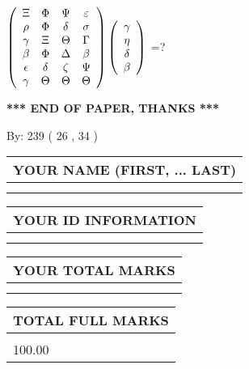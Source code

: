 \documentclass[12pt]{article}
\begin{document}
 
$  %
 \left( \begin{array}
 {
 c
 c
 c
 c
 }
                    \Xi & 
 \Phi & 
 \Psi & 
 \varepsilon \\ 
 \rho & 
 \Phi & 
 \delta & 
 \sigma \\ 
 \gamma & 
                    \Xi & 
 \Theta & 
 \Gamma \\ 
 \beta & 
 \Phi & 
 \Delta & 
 \beta \\ 
 \epsilon & 
 \delta & 
                    \zeta & 
 \Psi \\ 
 \gamma & 
 \Theta & 
 \Theta & 
 \Theta
 \end{array} \right)
 \left( \begin{array}
 {
 c
 }
 \gamma \\ 
 \eta \\ 
 \delta \\ 
 \beta
 \end{array} \right)
$ =?
 

 

 
\vspace{0.3in}
   
   
 \vspace{0.2in}
 
   
   
   
   
\vspace{1.0in} 
{\textbf{\large{ *** END OF PAPER, THANKS *** }}} 
   
   
\hspace{1.0in} By: 
 239 ( 26 ,  34 )
   
   
   
   
\newpage 
\setcounter{page}{ 
    31001 } 
   
   
   
   
\noindent\begin{tabular}{|l|}
\hline
YOUR NAME (FIRST, ... LAST)  \\
\hline
 \\ 
 \\ 
\hline
\end{tabular}
\hspace{0.05in} \begin{tabular}{|l|}
\hline
 YOUR   ID   INFORMATION  \\
\hline
 \\ 
 \\ 
\hline
\end{tabular}
   
   
\vspace{0.2in}\noindent\begin{tabular}{|l|}
\hline
YOUR TOTAL MARKS  \\
\hline
 \\ 
 \\ 
\hline
\end{tabular}
\hspace{0.05in} \begin{tabular}{|l|}
\hline
TOTAL FULL MARKS  \\
\hline
 \\ 
100.00 \\
\hline
\end{tabular}
   
\end{document}
